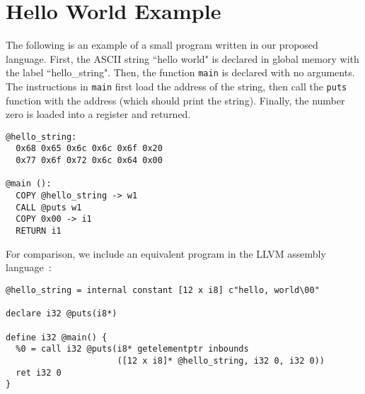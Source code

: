 \section{Hello World Example}

The following is an example of a small program written in our proposed language.
First, the ASCII string ``hello world" is declared in global memory
with the label ``hello\_string".
Then, the function \texttt{main} is declared with no arguments.
The instructions in \texttt{main} first load the address
of the string, then call the \texttt{puts} function with the address
(which should print the string). Finally, the number zero is loaded
into a register and returned.
\begin{verbatim}
@hello_string:
  0x68 0x65 0x6c 0x6c 0x6f 0x20
  0x77 0x6f 0x72 0x6c 0x64 0x00

@main ():
  COPY @hello_string -> w1
  CALL @puts w1
  COPY 0x00 -> i1
  RETURN i1
\end{verbatim}
For comparison, we include an equivalent program in the LLVM assembly language~\cite{lattner2008llvm}:
{\small
\begin{verbatim}
@hello_string = internal constant [12 x i8] c"hello, world\00"

declare i32 @puts(i8*)

define i32 @main() {
  %0 = call i32 @puts(i8* getelementptr inbounds
                      ([12 x i8]* @hello_string, i32 0, i32 0))
  ret i32 0
}
\end{verbatim}
}
